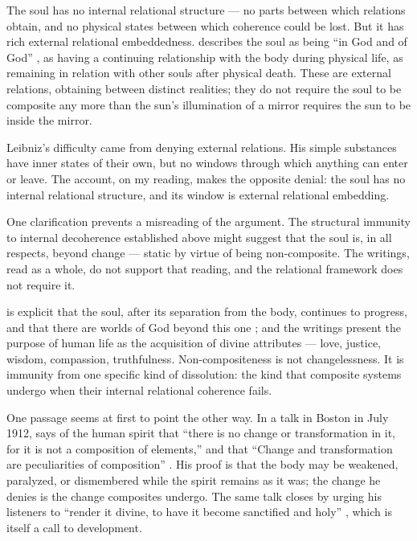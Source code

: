 The \bahai soul has no internal relational structure --- no parts between which
relations obtain, and no physical states between which coherence could be
lost. But it has rich external
relational embeddedness. \AbdulBaha describes the soul as being ``in God and
of God'' \citep[Ch.~66]{SAQ}, as having a continuing relationship with the
body during physical life, as remaining in relation with other souls after
physical death. These are external relations, obtaining between distinct
realities; they do not require the soul to be composite any more than the sun's
illumination of a mirror requires the sun to be inside the mirror.

Leibniz's difficulty came from denying external relations. His simple
substances have inner states of their own, but no windows through which
anything can enter or leave. The \bahai account, on my reading, makes the
opposite denial: the soul has no internal relational structure, and its window
is external relational embedding.

One clarification prevents a misreading of the argument. The structural
immunity to internal decoherence established above might suggest that the soul is, in all respects, beyond change --- static by virtue of
being non-composite. The \bahai writings, read as a whole, do not support that
reading, and the relational framework does not require it.

\Bahaullah is explicit that the soul, after its separation from the body,
continues to progress, and that there are worlds of God beyond this one
\citep{GleaningsBahaullah}; and the writings present the purpose of human
life as the acquisition of divine attributes --- love, justice, wisdom,
compassion, truthfulness. Non-compositeness is not changelessness. It is
immunity from one specific kind of dissolution: the kind that composite systems
undergo when their internal relational coherence fails.

One passage seems at first to point the other way. In a talk in Boston in July
1912, \AbdulBaha says of the human spirit that ``there is no change or
transformation in it, for it is not a composition of elements,'' and that
``Change and transformation are peculiarities of composition''
\citep[Talk 85]{PUP}. His proof is that the body may be weakened, paralyzed, or
dismembered while the spirit remains as it was; the change he denies is the
change composites undergo. The same talk closes by urging his listeners to
``render it divine, to have it become sanctified and holy''
\citep[Talk 85]{PUP}, which is itself a call to development.

